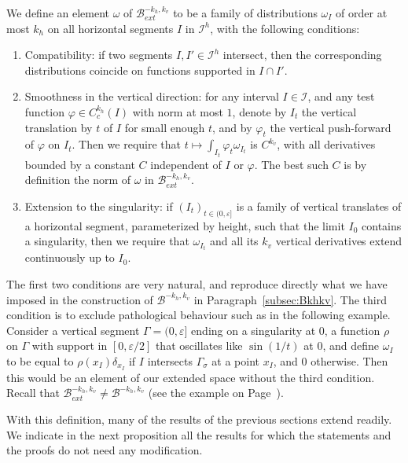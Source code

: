 \documentclass[11pt, a4paper, oneside, final, pagebackref]{amsart}
\newcommand{\boI}{\mathcal{I}}
\newcommand{\boB}{\mathcal{B}}
\renewcommand{\epsilon}{\varepsilon}
\renewcommand{\phi}{\varphi}
\theoremstyle{definition}
\numberwithin{equation}{section}
\begin{document}
We define an element $\omega$ of $\boB_{ext}^{-k_h, k_v}$ to be a family of
distributions $\omega_I$ of order at most $k_h$ on all horizontal segments
$I$ in $\boI^h$, with the following conditions:
\begin{enumerate}
\item Compatibility: if two segments $I, I'\in \boI^h$ intersect, then the
    corresponding distributions coincide on functions supported in $I\cap
    I'$.
\item Smoothness in the vertical direction: for any interval $I \in \boI$,
    and any test function $\phi \in C^{k_h}_c(I)$ with norm at most $1$,
    denote by $I_t$ the vertical translation by $t$ of $I$ for small enough
    $t$, and by $\phi_t$ the vertical push-forward of $\phi$ on $I_t$. Then
    we require that $t\mapsto \int_{I_t} \phi_t \omega_{I_t}$ is $C^{k_v}$,
    with all derivatives bounded by a constant $C$ independent of $I$ or
    $\phi$. The best such $C$ is by definition the norm of $\omega$ in
    $\boB_{ext}^{-k_h, k_v}$.
\item Extension to the singularity: if $(I_t)_{t \in (0,\epsilon]}$ is a
    family of vertical translates of a horizontal segment, parameterized by
    height, such that the limit $I_0$ contains a singularity, then we
    require that $\omega_{I_t}$ and all its $k_v$ vertical derivatives
    extend continuously up to $I_0$.
\end{enumerate}
The first two conditions are very natural, and reproduce directly what we
have imposed in the construction of $\boB^{-k_h, k_v}$ in
Paragraph~\ref{subsec:Bkhkv}. The third condition is to exclude pathological
behaviour such as in the following example. Consider a vertical segment
$\Gamma= (0,\epsilon]$ ending on a singularity at $0$, a function $\rho$ on
$\Gamma$ with support in $[0,\epsilon/2]$ that oscillates like $\sin(1/t)$ at
$0$, and define $\omega_I$ to be equal to $\rho(x_I) \delta_{x_I}$ if $I$
intersects $\Gamma_\sigma$ at a point $x_I$, and $0$ otherwise. Then this
would be an element of our extended space without the third condition. Recall
that $\boB_{ext}^{-k_h, k_v} \neq \boB^{-k_h, k_v}$ (see the example on
Page~\pageref{page_B_ext_not_B}).

With this definition, many of the results of the previous sections extend
readily. We indicate in the next proposition all the results for which the
statements and the proofs do not need any modification.
\end{document}
